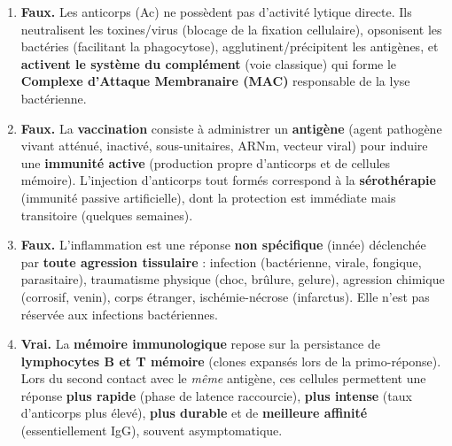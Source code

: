 \documentclass[11pt]{article}
\begin{document}
\begin{corrige}
\begin{enumerate}
    \item \textbf{Faux.} Les anticorps (Ac) ne possèdent pas d'activité lytique directe. Ils neutralisent les toxines/virus (blocage de la fixation cellulaire), opsonisent les bactéries (facilitant la phagocytose), agglutinent/précipitent les antigènes, et \textbf{activent le système du complément} (voie classique) qui forme le \textbf{Complexe d'Attaque Membranaire (MAC)} responsable de la lyse bactérienne.
    \item \textbf{Faux.} La \textbf{vaccination} consiste à administrer un \textbf{antigène} (agent pathogène vivant atténué, inactivé, sous-unitaires, ARNm, vecteur viral) pour induire une \textbf{immunité active} (production propre d'anticorps et de cellules mémoire). L'injection d'anticorps tout formés correspond à la \textbf{sérothérapie} (immunité passive artificielle), dont la protection est immédiate mais transitoire (quelques semaines).
    \item \textbf{Faux.} L'inflammation est une réponse \textbf{non spécifique} (innée) déclenchée par \textbf{toute agression tissulaire} : infection (bactérienne, virale, fongique, parasitaire), traumatisme physique (choc, brûlure, gelure), agression chimique (corrosif, venin), corps étranger, ischémie-nécrose (infarctus). Elle n'est pas réservée aux infections bactériennes.
    \item \textbf{Vrai.} La \textbf{mémoire immunologique} repose sur la persistance de \textbf{lymphocytes B et T mémoire} (clones expansés lors de la primo-réponse). Lors du second contact avec le \emph{même} antigène, ces cellules permettent une réponse \textbf{plus rapide} (phase de latence raccourcie), \textbf{plus intense} (taux d'anticorps plus élevé), \textbf{plus durable} et de \textbf{meilleure affinité} (essentiellement IgG), souvent asymptomatique.
\end{enumerate}
\end{corrige}
\end{document}
